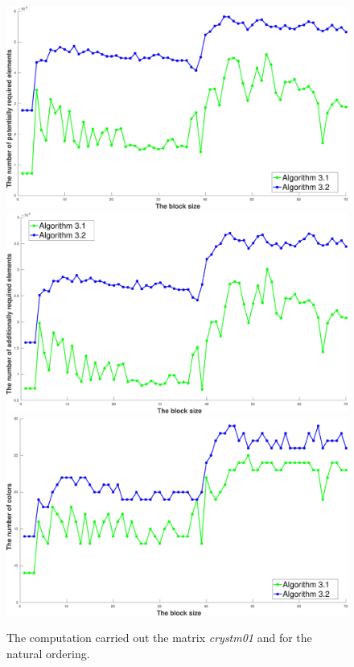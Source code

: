 \documentclass[12pt, twoside,a4paper,toc=bibliography]{scrbook}
\begin{document}
\begin{figure}
\centering
\includegraphics[width=0.75\linewidth]{crystm01_alg31_alg32_bls_nat_pot}
\includegraphics[width=0.75\linewidth]{crystm01_alg31_alg32_bls_nat_add}
\includegraphics[width=0.75\linewidth]{crystm01_alg31_alg32_bls_nat_cols}
\caption{The computation carried  out the matrix \textit{crystm01} and for the natural ordering.}
\label{crystm01_alg31_alg32_bls_nat}
\end{figure}

\clearpage
\end{document}
